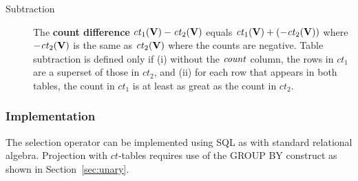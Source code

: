 \documentclass{acm_proc_article-sp}
\newcommand{\ct}{\mathit{ct}}
\begin{document}
\begin{description}
\item[Subtraction] %
The \textbf{count difference} $\ct_{1}(\set{V}) - \ct_{2}(\set{V})$ equals $\ct_{1}(\set{V}) + (- \ct_{2}(\set{V}))$ where $- \ct_{2}(\set{V})$ is the same as $\ct_{2}(\set{V})$ where the counts are negative. 
Table subtraction is defined only if (i) without the $\it{count}$ column, the rows in $\ct_{1}$ are a superset of those in $\ct_{2}$, and (ii) for each row that appears in both tables, the count in $\ct_{1}$ is at least as great as the count in $\ct_{2}$.
\end{description}


\subsubsection{Implementation}\label{sec:imp}

The selection operator can be implemented  using SQL as with standard relational algebra. 
Projection with $\ct$-tables requires use of the GROUP BY construct as shown in Section~\ref{sec:unary}. 
\end{document}
